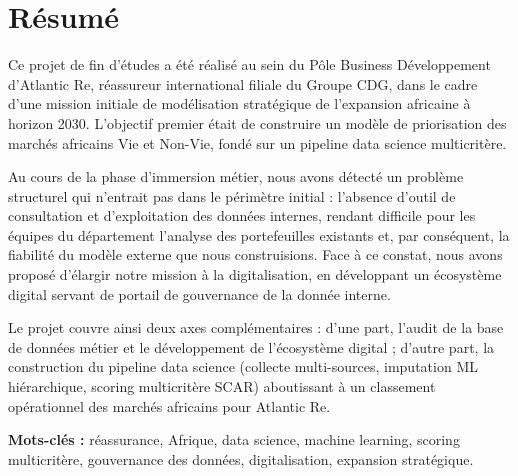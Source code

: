 \documentclass[../main.tex]{subfiles}
\begin{document}
\chapter*{Résumé}

Ce projet de fin d'études a été réalisé au sein du Pôle Business Développement
d'Atlantic Re, réassureur international filiale du Groupe CDG, dans le cadre d'une
mission initiale de modélisation stratégique de l'expansion africaine à horizon 2030.
L'objectif premier était de construire un modèle de priorisation des marchés africains
Vie et Non-Vie, fondé sur un pipeline data science multicritère.

Au cours de la phase d'immersion métier, nous avons détecté un problème structurel
qui n'entrait pas dans le périmètre initial : l'absence d'outil de consultation et
d'exploitation des données internes, rendant difficile pour les équipes du département
l'analyse des portefeuilles existants et, par conséquent, la fiabilité du modèle
externe que nous construisions. Face à ce constat, nous avons proposé d'élargir
notre mission à la digitalisation, en développant un écosystème digital servant de
portail de gouvernance de la donnée interne.

Le projet couvre ainsi deux axes complémentaires : d'une part, l'audit de la base
de données métier et le développement de l'écosystème digital ; d'autre part, la
construction du pipeline data science (collecte multi-sources, imputation ML
hiérarchique, scoring multicritère SCAR) aboutissant à un classement opérationnel
des marchés africains pour Atlantic Re.

\textbf{Mots-clés :} réassurance, Afrique, data science, machine learning, scoring
multicritère, gouvernance des données, digitalisation, expansion stratégique.

\clearpage

\end{document}
